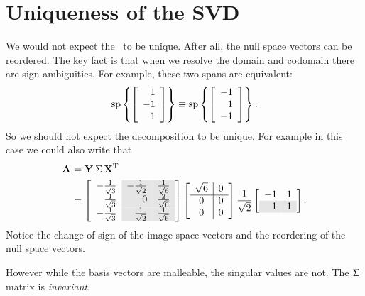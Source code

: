 \section{Uniqueness of the SVD}
We would not expect the \svdl \ to be unique. After all, the null space vectors can be reordered. The key fact is that when we resolve the domain and codomain there are sign ambiguities. For example, these two spans are equivalent:
\begin{equation}
  \spn \lst{\mat{r}{1\\-1\\1}} \equiv  \spn \lst{\mat{r}{-1\\1\\-1}}.
\end{equation}
So we should not expect the decomposition to be unique. For example in this case we could also write that
\begin{equation}
  \begin{split}
    \svda{T}\\
     & = 
    \mat{r>{\columncolor{ltgray}}r >{\columncolor{ltgray}}r}
    {-\sthree & -\stwo & \ssix\\
      \sthree &    0   & \frac{2}{\sqrt{6}}\\
     -\sthree &  \stwo & \ssix}
    \Sigmaexampleb
    \stwo \mat{rr}
    {-1 & 1\\
    \rowcolor{ltgray}
      1 & 1}.
  \end{split}
\end{equation}
Notice the change of sign of the image space vectors and the reordering of the null space vectors.

However while the basis vectors are malleable, the singular values are not. The $\sig{}$ matrix is \textit{invariant}. 

\endinput